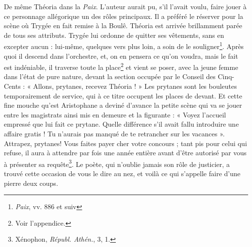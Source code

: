 \documentclass{book}%
\newcommand{\italique}[1]{\textit{#1}}%
\newcommand{\note}[1]{\footnote{#1}}
\begin{document}
De même Théoria dans la \italique{Paix}. L'auteur aurait pu, s'il l'avait voulu, faire jouer à ce personnage allégorique un des rôles principaux. Il a préféré le réserver pour la scène où Trygée en fait remise à la Boulê. Théoria est arrivée brillamment parée de tous ses attributs. Trygée lui ordonne de quitter ses vêtements, sans en excepter aucun : lui-même, quelques vers plus loin, a soin de le souligner\note{\italique{Paix}, vv. 886 et suiv}. Après quoi il descend dans l'orchestre, et, on en pensera ce qu'on voudra, mais le fait est indéniable, il traverse toute la place\note{Voir l'appendice.} et vient se poser, avec la jeune femme dans l'état de pure nature, devant la section occupée par le Conseil des Cinq-Cents : « Allons, prytanes, recevez Théoria ! » 
Les prytanes sont les bouleutes temporairement de service, qui à ce titre occupent les places de devant. Et cette fine mouche qu'est Aristophane a deviné d'avance la petite scène qui va se jouer entre les magistrats ainsi mis en demeure et la figurante : « Voyez l'accueil empressé que lui fait ce prytane. Quelle différence s'il avait fallu introduire une affaire gratis ! Tu n'aurais pas manqué de te retrancher sur les vacances ». 
Attrapez, prytanes! Vous faites payer cher votre concours ; tant pis pour celui qui refuse, il aura à attendre par fois une année entière avant d'être autorisé par vous à présenter sa requête\note{Xénophon, \italique{Républ. Athén.}, 3, 1.}. Le poète, qui n'oublie jamais son rôle de justicier, a trouvé cette occasion de vous le dire au nez, et voilà ce qui s'appelle faire d'une pierre deux coups. 
\end{document}
